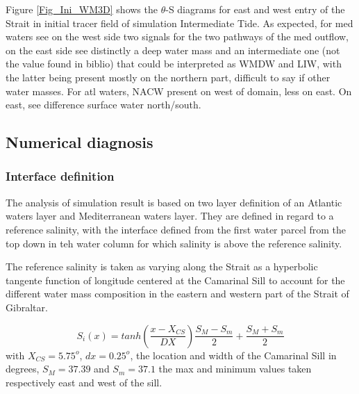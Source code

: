 Figure \ref{Fig_Ini_WM3D} shows the $\theta$-S diagrams for east and west entry of the Strait in initial tracer field of simulation Intermediate Tide. As expected, for med waters see on the west side two signals for the two pathways of the med outflow, on the east side see distinctly a deep water mass and an intermediate one (not the value found in biblio) that could be interpreted as WMDW and LIW, with the latter being present mostly on the northern part, difficult to say if other water masses. For atl waters, NACW present on west of domain, less on east. On east, see difference surface water north/south.




\subsection{Numerical diagnosis}


\subsubsection{Interface definition}

The analysis of simulation result is based on two layer definition of an Atlantic waters layer and Mediterranean waters layer. They are defined in regard to a reference salinity, with the interface defined from the first water parcel from the top down in teh water column for which salinity is above the reference salinity.

The reference salinity is taken as varying along the Strait as a hyperbolic tangente function of longitude centered at the Camarinal Sill to account for the different water mass composition in the eastern and western part of the Strait of Gibraltar. %



\begin{equation}
	S_i(x)=tanh(\frac{x-X_{CS}}{DX})\frac{S_M-S_m}{2}+\frac{S_M+S_m}{2}
\end{equation}
with $X_{CS}=5.75^o$, $dx=0.25^o$, the location and width of the Camarinal Sill in degrees, $S_M=37.39$ and $S_m=37.1$ the max and minimum values taken respectively east and west of the sill.

